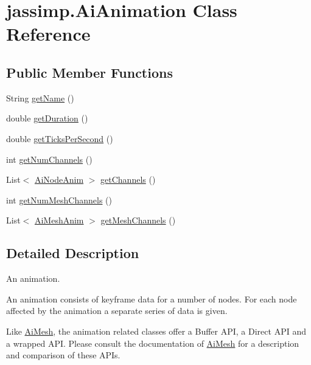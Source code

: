 \hypertarget{classjassimp_1_1_ai_animation}{\section{jassimp.\+Ai\+Animation Class Reference}
\label{classjassimp_1_1_ai_animation}
}
\subsection*{Public Member Functions}
\begin{DoxyCompactItemize}
\item 
String \hyperlink{classjassimp_1_1_ai_animation_a39c8bb3e73e707bbfbd481d6ae867b85}{get\+Name} ()
\item 
double \hyperlink{classjassimp_1_1_ai_animation_a4520eb9809ef6e43ba8f6500e603281e}{get\+Duration} ()
\item 
double \hyperlink{classjassimp_1_1_ai_animation_abf7631c3490591e58eee02c6bb92aa7a}{get\+Ticks\+Per\+Second} ()
\item 
int \hyperlink{classjassimp_1_1_ai_animation_afa0c8afdfd0a08c70fc1d176e68513a2}{get\+Num\+Channels} ()
\item 
List$<$ \hyperlink{classjassimp_1_1_ai_node_anim}{Ai\+Node\+Anim} $>$ \hyperlink{classjassimp_1_1_ai_animation_ae26ca1171dc4a396e04e5a0493a493d5}{get\+Channels} ()
\item 
int \hyperlink{classjassimp_1_1_ai_animation_a9f3bd3165cab54e0cd2b35c603dd0e89}{get\+Num\+Mesh\+Channels} ()
\item 
List$<$ \hyperlink{classjassimp_1_1_ai_mesh_anim}{Ai\+Mesh\+Anim} $>$ \hyperlink{classjassimp_1_1_ai_animation_a90433a0681bfd10b2c8aca39c07ec0e7}{get\+Mesh\+Channels} ()
\end{DoxyCompactItemize}


\subsection{Detailed Description}
An animation.

An animation consists of keyframe data for a number of nodes. For each node affected by the animation a separate series of data is given.

Like \hyperlink{classjassimp_1_1_ai_mesh}{Ai\+Mesh}, the animation related classes offer a Buffer A\+P\+I, a Direct A\+P\+I and a wrapped A\+P\+I. Please consult the documentation of \hyperlink{classjassimp_1_1_ai_mesh}{Ai\+Mesh} for a description and comparison of these A\+P\+Is. 

